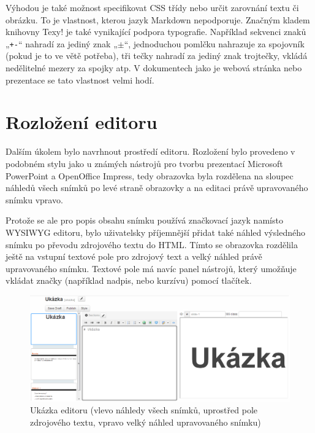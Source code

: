 \documentclass[11pt,twoside,a4paper]{book}
\begin{document}
Výhodou je také možnost specifikovat CSS třídy nebo určit zarovnání textu či obrázku. To je vlastnost, kterou jazyk Markdown nepodporuje. Značným kladem knihovny Texy! je také vynikající podpora typografie. Například sekvenci znaků „\lstinline|+-|“ nahradí za jediný znak „$\pm$“, jednoduchou pomlčku nahrazuje za spojovník (pokud je to ve větě potřeba), tři tečky nahradí za jediný znak trojtečky, vkládá nedělitelné mezery za spojky atp. V dokumentech jako je webová stránka nebo prezentace se tato vlastnost velmi hodí.


\section{Rozložení editoru}
Dalším úkolem bylo navrhnout prostředí editoru. Rozložení bylo provedeno v podobném stylu jako u známých nástrojů pro tvorbu prezentací Microsoft PowerPoint a OpenOffice Impress, tedy obrazovka byla rozdělena na sloupec náhledů všech snímků po levé straně obrazovky a na editaci právě upravovaného snímku vpravo.

Protože se ale pro popis obsahu snímku používá značkovací jazyk namísto WYSIWYG editoru, bylo uživatelsky příjemnější přidat také náhled výsledného snímku po převodu zdrojového textu do HTML. Tímto se obrazovka rozdělila ještě na vstupní textové pole pro zdrojový text a velký náhled právě upravovaného snímku. Textové pole má navíc panel nástrojů, který umožňuje vkládat značky (například nadpis, nebo kurzívu) pomocí tlačítek.

\begin{figure}[ht]
	\begin{center}
		\includegraphics[width=14cm]{PRO-img/editor2.png}
		\caption[Ukázka editoru]{Ukázka editoru (vlevo náhledy všech snímků, uprostřed pole zdrojového textu, vpravo velký náhled upravovaného snímku)}
		\label{fig:editorLayout}
	\end{center}
\end{figure}
\end{document}
